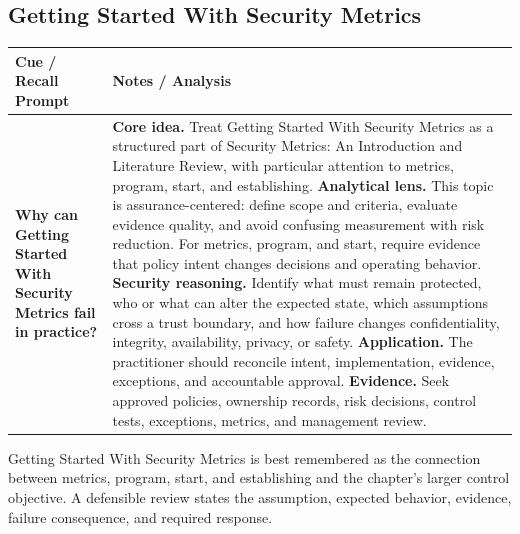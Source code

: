 \documentclass[11pt]{article}
\newcommand{\CornellHeader}{%
\rowcolor{Navy}\color{white}\bfseries Cue / Recall Prompt & \color{white}\bfseries Notes / Analysis\\\hline}
\newcommand{\CornellRow}[2]{%
\cellcolor{CueGray}\RaggedRight\textbf{#1} & \RaggedRight #2\\\hline}
\begin{document}
\subsection*{Getting Started With Security Metrics}
\begin{longtable}{>{\RaggedRight\arraybackslash}p{}|>{\RaggedRight\arraybackslash}p{}}
\CornellHeader
\CornellRow{Why can Getting Started With Security Metrics fail in practice?}{\textbf{Core idea.} Treat Getting Started With Security Metrics as a structured part of Security Metrics: An Introduction and Literature Review, with particular attention to metrics, program, start, and establishing. \textbf{Analytical lens.} This topic is assurance-centered: define scope and criteria, evaluate evidence quality, and avoid confusing measurement with risk reduction. For metrics, program, and start, require evidence that policy intent changes decisions and operating behavior. \textbf{Security reasoning.} Identify what must remain protected, who or what can alter the expected state, which assumptions cross a trust boundary, and how failure changes confidentiality, integrity, availability, privacy, or safety. \textbf{Application.} The practitioner should reconcile intent, implementation, evidence, exceptions, and accountable approval. \textbf{Evidence.} Seek approved policies, ownership records, risk decisions, control tests, exceptions, metrics, and management review.}
\end{longtable}
\begin{topicsummary}
Getting Started With Security Metrics is best remembered as the connection between metrics, program, start, and establishing and the chapter's larger control objective. A defensible review states the assumption, expected behavior, evidence, failure consequence, and required response.
\end{topicsummary}
\end{document}
